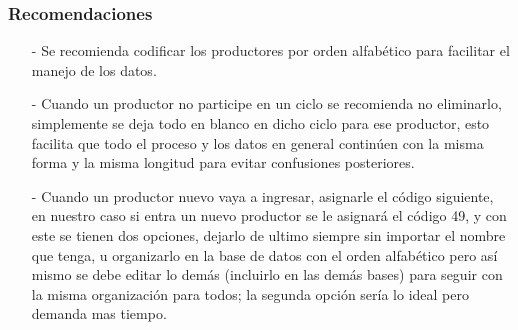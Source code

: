 \documentclass[11pt]{beamer}
\begin{document}
\begin{frame}
\frametitle{Recomendaciones}
\begin{itemize}
\item[-]Se recomienda codificar los productores por orden alfabético para facilitar el manejo de los datos.
\item[-]Cuando un productor no participe en un ciclo se recomienda no eliminarlo, simplemente se deja todo en blanco en dicho ciclo para ese productor, esto facilita que todo el proceso y los datos en general continúen con la misma forma y la misma longitud para evitar confusiones posteriores.
\item[-]Cuando un productor nuevo vaya a ingresar, asignarle el código siguiente, en nuestro caso si entra un nuevo productor se le asignará el código 49, y con este se tienen dos opciones, dejarlo de ultimo siempre sin importar el nombre que tenga, u organizarlo en la base de datos con el orden alfabético pero así mismo se debe editar lo demás (incluirlo en las demás bases) para seguir con la misma organización para todos; la segunda opción sería lo ideal pero demanda mas tiempo.
\end{itemize}
\end{frame}
\end{document}
